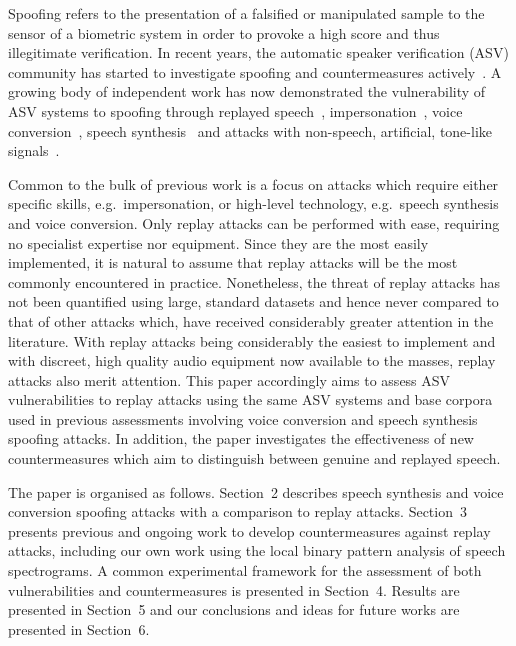 

Spoofing refers to the presentation of a falsified or manipulated sample 
to the sensor of a biometric system in order to provoke a high score and 
thus illegitimate verification.
In recent years, the automatic speaker verification (ASV) community has 
started to investigate spoofing and countermeasures 
actively~\cite{interspeechSpecialSession, Wu2014a}. 
A growing 
body of independent work has now demonstrated the vulnerability of ASV 
systems to spoofing through 
replayed speech~\cite{Lindberg1999,Villalba2010},
impersonation~\cite{Blomberg2004,Farrus2008}, voice 
conversion~\cite{Perrot2005, Pellom1999}, speech 
synthesis~\cite{Masuko1999, Leon2010} and attacks with non-speech, 
artificial, tone-like signals~\cite{Alegre2012b}.

Common to the bulk of previous work is a focus on attacks 
which require either specific skills, e.g.~impersonation, or high-level 
technology, e.g.~speech synthesis and voice conversion. 
Only replay attacks can be performed with ease, requiring no specialist 
expertise nor equipment.  Since they are the most easily 
implemented, it is natural to assume that replay attacks will be the 
most commonly encountered in practice.  Nonetheless, the threat of 
replay attacks has not been quantified using large, standard 
datasets and hence never compared to that of other attacks which, have 
received considerably greater attention in the literature.
With replay attacks being considerably the easiest to implement
and with discreet, high quality audio equipment now available to the masses,
replay attacks also merit attention.
This paper accordingly aims to assess ASV vulnerabilities 
to replay attacks using the same ASV systems and base corpora used in 
previous assessments involving voice conversion and speech synthesis 
spoofing attacks.  In addition, the paper investigates the effectiveness of 
new countermeasures which aim to distinguish between genuine and replayed speech.  

The paper is organised as follows.  Section~2 describes speech synthesis and voice conversion spoofing attacks with a comparison to replay attacks. Section~3 presents previous and ongoing work to develop countermeasures against replay attacks, including our own work using the local binary pattern analysis of speech spectrograms.  A common experimental framework for the assessment of both vulnerabilities and countermeasures is presented in Section~4. Results are presented in Section~5 and our conclusions and ideas for future works are presented in Section~6.
